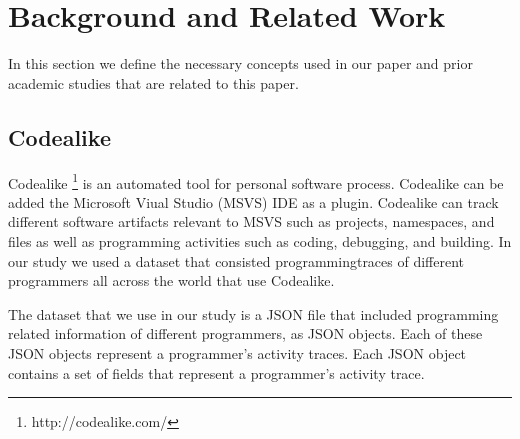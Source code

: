 \section{Background and Related Work}
In this section we define the necessary concepts used in our paper and prior academic studies that are related to this paper.


\subsection{Codealike}
Codealike \footnote{http://codealike.com/} is an automated tool for personal software process. Codealike can be added the Microsoft Viual Studio (MSVS) IDE as a plugin. Codealike can track different software artifacts relevant to MSVS such as projects, namespaces, and files as well as programming activities such as coding, debugging, and building. In our study we used a dataset that consisted programmingtraces of different programmers all across the world that use Codealike. 

The dataset that we use in our study is a JSON file that included programming related information of different programmers, as JSON objects. Each of these JSON objects represent a programmer's activity traces. Each JSON object contains a set of fields that represent a programmer's activity trace. 


